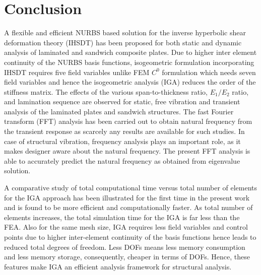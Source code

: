 \documentclass[3p,preprint,12pt]{elsarticle}
\begin{document}
\section{Conclusion}
{\color{purple}A flexible and efficient NURBS based solution for the inverse hyperbolic shear deformation theory (IHSDT) has been proposed for both static and dynamic analysis of laminated and sandwich composite plates.} %
Due to higher inter element continuity of the NURBS basis functions, isogeometric formulation incorporating IHSDT requires five field variables unlike FEM $C^0$ formulation which needs seven field variables and hence the isogeometric analysis (IGA) reduces the order of the stiffness matrix. The effects of the various span-to-thickness ratio, $E_{1}/E_{2}$ ratio, and lamination sequence are observed for static, free vibration and transient analysis of the laminated plates and sandwich structures. {\color{purple}The fast Fourier transform (FFT) analysis has been carried out to obtain natural frequency from the transient response as scarcely any results are available for such studies.} In case of structural vibration, frequency analysis plays an important role, as it makes designer aware about the natural frequency. The present FFT analysis is able to accurately predict the natural frequency as obtained from eigenvalue solution.

{\color{purple}A comparative study of total computational time versus total number of elements for the IGA approach has been illustrated for the first time in the present work and is found to be more efficient and computationally faster.} As total number of elements increases, the total simulation time for the IGA is far less than the FEA. Also for the same mesh size, IGA requires less field variables and control points due to higher inter-element continuity of the basis functions hence leads to reduced total degrees of freedom. Less DOFs means less memory consumption and less memory storage, consequently, cheaper in terms of DOFs. Hence, these features make IGA an efficient analysis framework for structural analysis.
\end{document}
